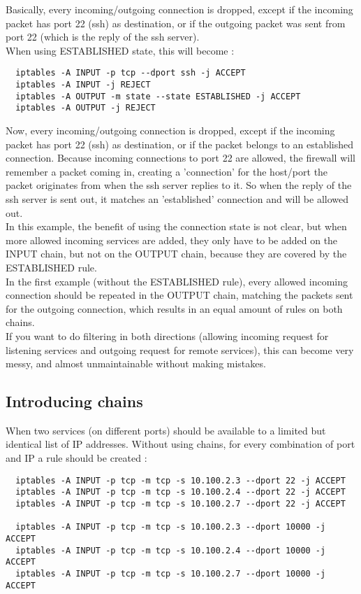 \documentclass[a4paper,12pt]{article}
\begin{document}
Basically, every incoming/outgoing connection is dropped, except if the incoming packet has port 22 (ssh) as destination, or if the outgoing packet was sent from port 22 (which is the reply of the ssh server).\\

When using ESTABLISHED state, this will become :
\begin{verbatim}
  iptables -A INPUT -p tcp --dport ssh -j ACCEPT
  iptables -A INPUT -j REJECT
  iptables -A OUTPUT -m state --state ESTABLISHED -j ACCEPT
  iptables -A OUTPUT -j REJECT
\end{verbatim}

Now, every incoming/outgoing connection is dropped, except if the incoming packet has port 22 (ssh) as destination, or if the packet belongs to an established connection. Because incoming connections to port 22 are allowed, the firewall will remember a packet coming in, creating a 'connection' for the host/port the packet originates from when the ssh server replies to it. So when the reply of the ssh server is sent out, it matches an 'established' connection and will be allowed out.\\

In this example, the benefit of using the connection state is not clear, but when more allowed incoming services are added, they only have to be added on the INPUT chain, but not on the OUTPUT chain, because they are covered by the ESTABLISHED rule.\\
In the first example (without the ESTABLISHED rule), every allowed incoming connection should be repeated in the OUTPUT chain, matching the packets sent for the outgoing connection, which results in an equal amount of rules on both chains.\\
If you want to do filtering in both directions (allowing incoming request for listening services and outgoing request for remote services), this can become very messy, and almost unmaintainable without making mistakes.\\

\subsection{Introducing chains}
When two services (on different ports) should be available to a limited but identical list of IP addresses.
Without using chains, for every combination of port and IP a rule should be created :
\begin{verbatim}
  iptables -A INPUT -p tcp -m tcp -s 10.100.2.3 --dport 22 -j ACCEPT
  iptables -A INPUT -p tcp -m tcp -s 10.100.2.4 --dport 22 -j ACCEPT
  iptables -A INPUT -p tcp -m tcp -s 10.100.2.7 --dport 22 -j ACCEPT

  iptables -A INPUT -p tcp -m tcp -s 10.100.2.3 --dport 10000 -j ACCEPT
  iptables -A INPUT -p tcp -m tcp -s 10.100.2.4 --dport 10000 -j ACCEPT
  iptables -A INPUT -p tcp -m tcp -s 10.100.2.7 --dport 10000 -j ACCEPT
\end{verbatim}
\end{document}
